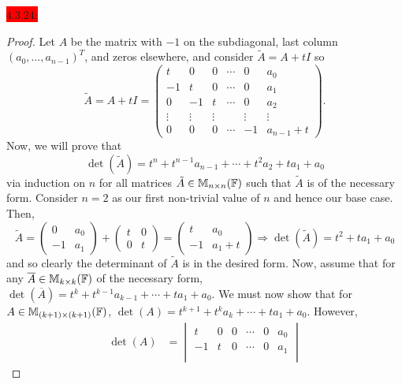 \documentclass{exam}
\begin{document}
  \colorbox{red}{\underline{$4.3.24$}:}
  \begin{solution}
    \begin{proof}
      Let $A$ be the matrix with $-1$ on the subdiagonal, last column $(a_0, \dots, a_{n-1})^T$, and zeros elsewhere, and consider $\tilde{A} = A + tI$ so 
      \[
        \tilde{A} = A + tI = \begin{pmatrix}
          t & 0 & 0 & \cdots & 0 & a_0 \\
          -1 & t & 0 & \cdots & 0 & a_1 \\
          0 & -1 & t & \cdots & 0 & a_2 \\
          \vdots & \vdots & \vdots & & \vdots & \vdots \\
          0 & 0 & 0 & \cdots & -1 & a_{n-1} + t
        \end{pmatrix}.
      \]
      Now, we will prove that 
      \[
        \det(\tilde{A}) = t^n + t^{n-1}a_{n-1} + \cdots + t^{2}a_2 + t a_1 + a_0
      \]
      via induction on $n$ for all matrices $\tilde{A} \in \mathbb M_{n \times n}(\mathbb F)$ such that $\tilde{A}$ is of the necessary form. Consider $n = 2$ as our first non-trivial value of $n$ and hence our base case. Then, 
      \[
        \tilde{A} = \begin{pmatrix}
          0 & a_0 \\
          -1 & a_1
        \end{pmatrix}
        + \begin{pmatrix}
          t & 0 \\
          0 & t
        \end{pmatrix}
        = \begin{pmatrix}
          t & a_0 \\
          -1 & a_1 + t
        \end{pmatrix}
        \Rightarrow \det(\tilde{A}) = t^2 + ta_1 + a_0
      \]
      and so clearly the determinant of $\tilde{A}$ is in the desired form. Now, assume that for any $\overline{A} \in \mathbb M_{k \times k}(\mathbb F)$ of the necessary form, $\det(\overline{A}) = t^{k} + t^{k-1}a_{k-1} + \cdots + t a_{1} + a_0$. We must now show that for $A \in \mathbb M_{(k + 1) \times (k + 1)}(\mathbb F)$, $\det(A) = t^{k+1} + t^{k}a_{k} + \cdots + t a_{1} + a_0$. However, 
      \begin{align*}
        \det(A) &= \begin{vmatrix}
          t & 0 & 0 & \cdots & 0 & a_0 \\
          -1 & t & 0 & \cdots & 0 & a_1 \\

\end{vmatrix}
\end{align*}
\end{proof}
\end{solution}
\end{document}
